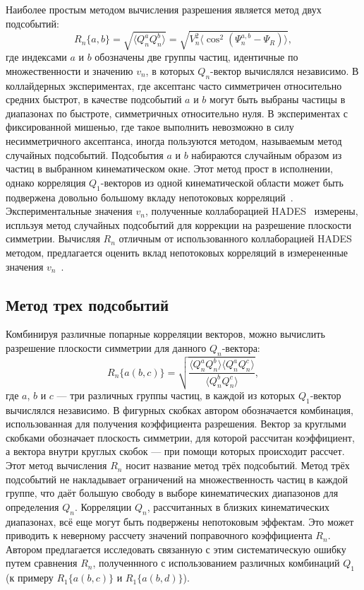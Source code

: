 Наиболее простым методом вычисления разрешения является метод двух подсобытий:
%
\begin{equation}
    R_n\{a,b\} = \sqrt{ \langle Q_n^a Q_n^b \rangle } = \sqrt{ V_n^2 \langle \cos^{2}( \Psi^{a,b}_n - \Psi_R ) \rangle },
    \label{eq:r1_2sub}
\end{equation}
где индексами $a$ и $b$ обозначены две группы частиц, идентичные по множественности и значению $v_n$, в которых $Q_n$-вектор вычислялся независимо.
В коллайдерных экспериментах, где аксептанс часто симметричен относительно средних быстрот, в качестве подсобытий $a$ и $b$ могут быть выбраны частицы в диапазонах по быстроте, симметричных относительно нуля.
В экспериментах с фиксированной мишенью, где такое выполнить невозможно в силу несимметричного аксептанса, иногда пользуются методом, называемым метод случайных подсобытий.
Подсобытия $a$ и $b$ набираются случайным образом из частиц в выбранном кинематическом окне.
Этот метод прост в исполнении, однако корреляция $Q_1$-векторов из одной кинематической области может быть подвержена довольно большому вкладу непотоковых корреляций~\cite{Mamaev:2020lpi}.
Экспериментальные значения $v_n$, полученные коллаборацией HADES~\cite{HADES:2020lob} измерены, испльзуя метод случайных подсобытий для коррекции на разрешение плоскости симметрии. 
Вычисляя $R_n$ отличным от использованного коллаборацией HADES методом, предлагается оценить вклад непотоковых корреляций в измерененные значения $v_n$~\cite{Mamaev:2020lpi, Mamaev:2020qom}.

\subsection{Метод трех подсобытий}

Комбинируя различные попарные корреляции векторов, можно вычислить разрешение плоскости симметрии для данного $Q_n$-вектора:
%
\begin{equation}
    R_n\{a(b,c)\}  =  \sqrt { \frac{ \langle Q_n^a Q_n^b \rangle \langle Q_n^a Q_n^c \rangle }{ \langle Q_n^b Q_n^c \rangle} },
    \label{eq:r1_3sub}
\end{equation}
%
где $a$, $b$ и $c$ --- три различных группы частиц, в каждой из которых $Q_1$-вектор вычислялся независимо.
В фигурных скобках автором обозначается комбинация, использованная для получения коэффициента разрешения.
Вектор за круглыми скобками обозначает плоскость симметрии, для которой рассчитан коэффициент, а вектора внутри круглых скобок --- при помощи которых происходит рассчет.
Этот метод вычисления $R_n$ носит название метод трёх подсобытий.
Метод трёх подсобытий не накладывает ограничений на множественность частиц в каждой группе, что даёт большую свободу в выборе кинематических диапазонов для определения $Q_n$.
Корреляции $Q_n$, рассчитанных в близких кинематических диапазонах, всё еще могут быть подвержены непотоковым эффектам.
Это может приводить к неверному рассчету значений поправочного коэффициента $R_n$.
Автором предлагается исследовать связанную с этим систематическую ошибку путем сравнения $R_n$, полученнного с использованием различных комбинаций $Q_1$ (к примеру $R_1\{a(b,c)\}$ и $R_1\{a(b,d)\}$).

